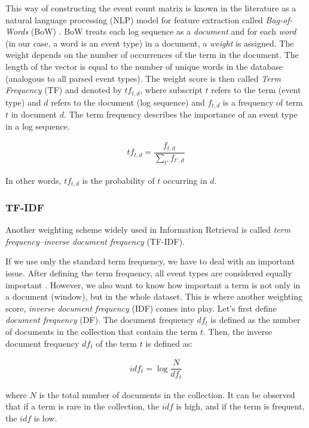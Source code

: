 This way of constructing the event count matrix is known in the literature as a natural language processing (NLP) model for feature extraction called \textit{Bag-of-Words} (BoW) \cite{informationRetrieval2008}. BoW treats each log sequence as a \textit{document} and for each \textit{word} (in our case, a word is an event type) in a document, a \textit{weight} is assigned. The weight depends on the number of occurrences of the term in the document. The length of the vector is equal to the number of unique words in the database (analogous to all parsed event types). The weight score is then called \textit{Term Frequency} (TF) and denoted by $tf_{t,d}$, where subscript $t$ refers to the term (event type) and $d$ refers to the document (log sequence) and $f_{t,d}$ is a frequency of term $t$ in document $d$. The term frequency describes the importance of an event type in a log sequence.

\begin{gather}
    tf_{t,d} = \dfrac{f_{t,d}}{\sum_{t'}f_{t', d}}
\end{gather}

In other words, $tf_{t, d}$ is the probability of $t$ occurring in $d$.

\subsubsection*{TF-IDF}
Another weighting scheme widely used in Information Retrieval is called \textit{term frequency–inverse document frequency} (TF-IDF). 

If we use only the standard term frequency, we have to deal with an important issue. After defining the term frequency, all event types are considered equally important \cite{informationRetrieval2008}. However, we also want to know how important a term is not only in a document (window), but in the whole dataset. This is where another weighting score, \textit{inverse document frequency} (IDF) comes into play. Let's first define \textit{document frequency} (DF). The document frequency $df_t$ is defined as the number of documents in the collection that contain the term $t$. Then, the inverse document frequency $df_t$ of the term $t$ is defined as: 


\begin{gather}
    idf_t = \log{\dfrac{N}{df_t}}
    \label{formula:idf}
\end{gather}

where $N$ is the total number of documents in the collection. It can be observed that if a term is rare in the collection, the $idf$ is high, and if the term is frequent, the $idf$ is low.

